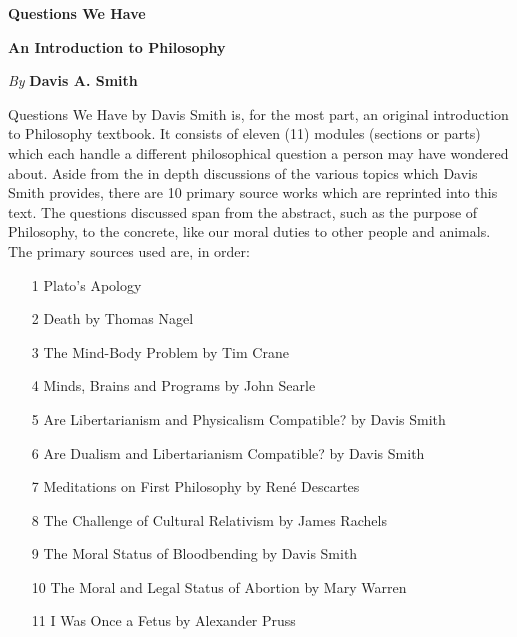 \thispagestyle{empty}

\pagestyle{empty}

\vspace*{80pt}

\begin{raggedleft}
\fontsize{30pt}{24pt}\sffamily
\selectfont
  \textbf{Questions We Have }

\medskip\fontsize{18pt}{20pt}\selectfont

\textbf{An Introduction to Philosophy}

\vfill
\fontsize{12pt}{16pt}\selectfont \textit{By }  \textbf{Davis A. Smith}\\
\end{raggedleft}

\newpage

\noindent%
Questions We Have by Davis Smith is, for the most part, an original introduction to Philosophy textbook. It consists of eleven (11) modules (sections or parts) which each handle a different philosophical question a person may have wondered about. Aside from the in depth discussions of the various topics which Davis Smith provides, there are 10 primary source works which are reprinted into this text. The questions discussed span from the abstract, such as the purpose of Philosophy, to the concrete, like our moral duties to other people and animals. 
The primary sources used are, in order:
\begin{enumerate}
\item[1] Plato's Apology
\item[2] Death by Thomas Nagel
\item[3] The Mind-Body Problem by Tim Crane
\item[4] Minds, Brains and Programs by John Searle
\item[5] Are Libertarianism and Physicalism Compatible? by Davis Smith
\item[6] Are Dualism and Libertarianism Compatible? by Davis Smith
\item[7] Meditations on First Philosophy by Ren\'e Descartes
\item[8] The Challenge of Cultural Relativism by James Rachels
\item[9] The Moral Status of Bloodbending by Davis Smith
\item[10] The Moral and Legal Status of Abortion by Mary Warren
\item[11] I Was Once a Fetus by Alexander Pruss
\end{enumerate}

